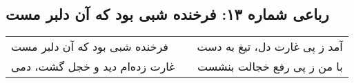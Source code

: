 \begin{center}
\section*{رباعی شماره ۱۳: فرخنده شبی بود که آن دلبر مست}
\label{sec:013}
\begin{longtable}{l p{0.5cm} r}
فرخنده شبی بود که آن دلبر مست
&&
آمد ز پی غارت دل، تیغ به دست
\\
غارت زده‌ام دید و خجل گشت، دمی
&&
با من ز پی رفع خجالت بنشست
\\
\end{longtable}
\end{center}
